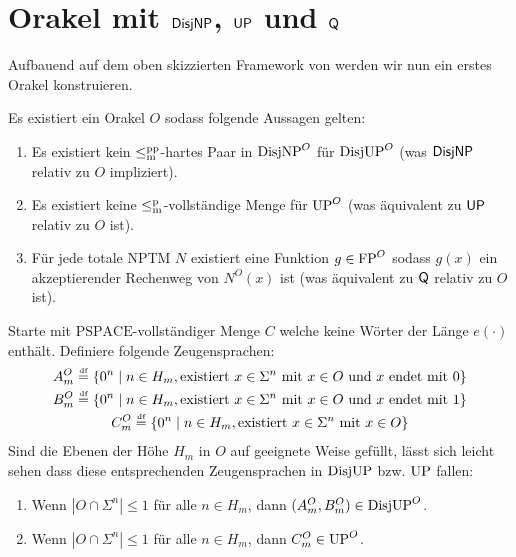 \section{Orakel mit $\mathsf{DisjNP}$, $\mathsf{UP}$ und $\mathsf{Q}$}

Aufbauend auf dem oben skizzierten Framework von \textcite{dose_np-completeness_2019} werden wir nun ein erstes Orakel konstruieren.

\begin{theorem}
    Es existiert ein Orakel $O$ sodass folgende Aussagen gelten:
    \begin{enumerate}
        \item Es existiert kein $\leq_\mathrm{m}^\mathrm{pp}$-hartes Paar in $\mathrm{DisjNP}^O$ für $\mathrm{DisjUP}^O$ (was $\mathsf{DisjNP}$ relativ zu $O$ impliziert).
        \item Es existiert keine $\leq_\mathrm{m}^\mathrm{p}$-vollständige Menge für $\mathrm{UP}^O$ (was äquivalent zu $\mathsf{UP}$ relativ zu $O$ ist).
        \item Für jede totale NPTM $N$ existiert eine Funktion $g\in\mathrm{FP}^O$ sodass $g(x)$ ein akzeptierender Rechenweg von $N^O(x)$ ist (was äquivalent zu $\mathsf{Q}$ relativ zu $O$ ist).
    \end{enumerate}
\end{theorem}



Starte mit $\mathrm{PSPACE}$-vollständiger Menge $C$ welche keine Wörter der Länge $e(\cdot)$ enthält.
Definiere folgende Zeugensprachen:
\begin{gather*}
    A_m^O \stackrel{\text{\smash{\tiny df}}}{=} \{ 0^n \mid n\in H_m, \text{existiert $x\in \Sigma^{n}$ mit } x\in O \text{ und $x$ endet mit $0$} \}\\
    B_m^O \stackrel{\text{\smash{\tiny df}}}{=} \{ 0^n \mid n\in H_m, \text{existiert $x\in \Sigma^{n}$ mit } x\in O \text{ und $x$ endet mit $1$} \}\\
    C_m^O \stackrel{\text{\smash{\tiny df}}}{=} \{ 0^n \mid n\in H_m, \text{existiert $x\in \Sigma^{n}$ mit } x\in O  \}
\end{gather*}
Sind die Ebenen der Höhe $H_m$ in $O$ auf geeignete Weise gefüllt, lässt sich leicht sehen dass diese entsprechenden Zeugensprachen in $\mathrm{DisjUP}$ bzw. $\mathrm{UP}$ fallen:
\begin{claim}
    \begin{enumerate}
        \item Wenn $|O\cap \Sigma^{n}|\leq 1$ für alle $n\in H_m$, dann $(A_m^O, B_m^O)\in\mathrm{DisjUP}^O$.
        \item Wenn $|O\cap \Sigma^n|\leq 1$ für alle $n\in H_m$, dann $C_m^O \in \mathrm{UP}^O$.
    \end{enumerate}
\end{claim}


